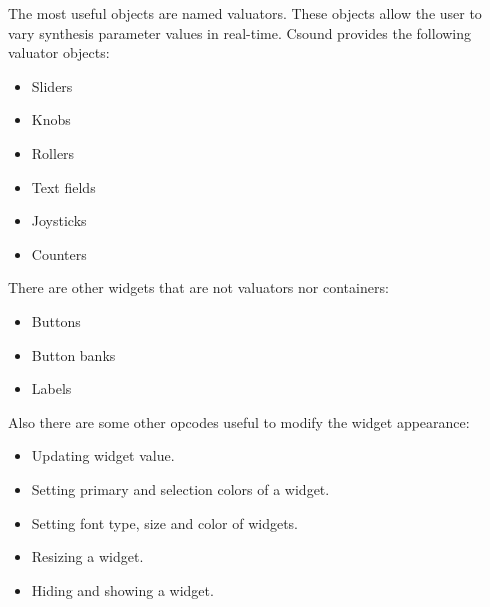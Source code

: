   The most useful objects are named valuators. These objects allow the user to vary synthesis parameter values in real-time. Csound provides the following valuator objects: 


 
\begin{itemize}
\item 

 Sliders

\item 

 Knobs

\item 

 Rollers

\item 

 Text fields

\item 

 Joysticks

\item 

 Counters


\end{itemize}


  There are other widgets that are not valuators nor containers: 


 
\begin{itemize}
\item 

 Buttons

\item 

 Button banks

\item 

 Labels


\end{itemize}


  Also there are some other opcodes useful to modify the widget appearance: 


 
\begin{itemize}
\item 

 Updating widget value.

\item 

 Setting primary and selection colors of a widget.

\item 

 Setting font type, size and color of widgets.

\item 

 Resizing a widget.

\item 

 Hiding and showing a widget.


\end{itemize}


